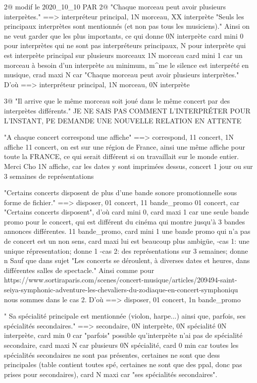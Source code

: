\documentclass[12pt,a4paper]{article}
\begin{document}
{2@ modif le 2020_10_10 PAR 
2@ "Chaque morceau peut avoir plusieurs interprètes."
==> interpréteur principal, 1N morceau, XX interprète
"Seuls les principaux interprètes sont mentionnés (et non pas tous les musiciens)."
Ainsi on ne veut garder que les plus importants, ce qui donne
0N interprète card mini 0 pour interprètes qui ne sont pas interpréteurs principaux, 
N pour interprète qui est interprète principal sur plusieurs morceaux
1N morceau card mini 1 car un morceau à besoin d'un interprète au minimum, m^me le silence est interprété en musique, crad maxi N car "Chaque morceau peut avoir plusieurs interprètes."
D'où ==> interpréteur principal, 1N morceau, 0N interprète



3@ "Il arrive que le même morceau soit joué dans le même concert par des interprètes différents."
JE NE SAIS PAS COMMENT L'INTERPRÉTER POUR L'INSTANT, PE DEMANDE UNE NOUVELLE RELATION
EN ATTENTE



"A chaque concert correspond une affiche"
==> correspond, 11 concert, 1N affiche
11 concert, on est sur une région de France, ainsi une même affiche pour toute la FRANCE, ce qui serait différent si on travaillait sur le monde entier. Merci Cho
1N affiche, car les dates y sont imprimées dessus, concert 1 jour ou sur 3 semaines de représentations


"Certains concerts disposent de plus d'une bande sonore promotionnelle sous forme de fichier."
==> disposer, 01 concert, 11 bande_promo
01 concert, car "Certains concerts disposent", d'où card mini 0, card maxi 1 car une seule bande promo pour le concert, qui est différent du cinéma qui montre jusqu'à 3 bandes annonces différentes.
11 bande_promo, card mini 1 une bande promo qui n'a pas de concert est un non sens, card maxi lui est beaucoup plus ambigüe, 
	-cas 1: une unique répresentation; donne 1
	-cas 2: des représentations sur 3 semaines; donne n
Sauf que dans sujet "Les concerts se déroulent, à diverses dates et heures, dans différentes salles de spectacle." Ainsi comme pour https://www.sortiraparis.com/scenes/concert-musique/articles/209494-saint-seiya-symphonic-adventure-les-chevaliers-du-zodiaque-en-concert-symphoniqu
nous sommes dans le cas 2. D'où 
==> disposer, 01 concert, 1n bande_promo



" Sa spécialité principale est mentionnée (violon, harpe...) ainsi que, parfois, ses spécialités secondaires."
==> secondaire, 0N interprète, 0N spécialité
0N interprète, card min 0 car "parfois" possible qu'interprète n'ai pas de spécialité secondaire,
card maxi N car plusieurs
0N spécialité, card 0 min car toutes les spécialités secondaires ne sont pas présentes, certaines ne sont que dess principales (table contient toutes spé, certaines ne sont que des ppal, donc pas prises pour secondaires), 
card N maxi car "ses spécialités secondaires".




}
\end{document}
